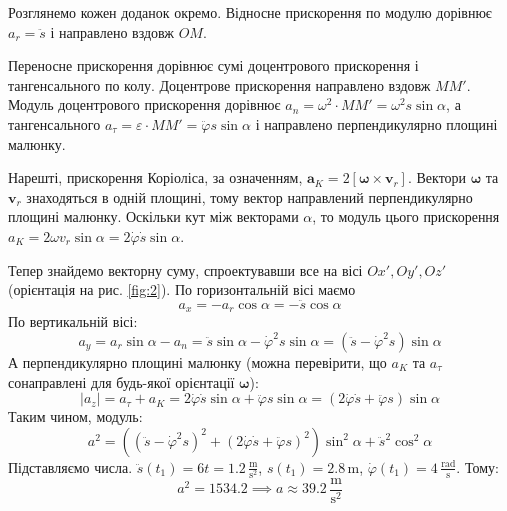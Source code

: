\documentclass[12pt]{extarticle}
\begin{document}
Розглянемо кожен доданок окремо. Відносне прискорення по модулю дорівнює $a_r=\ddot{s}$ і направлено вздовж $OM$. 

Переносне прискорення дорівнює сумі доцентрового прискорення і тангенсального по колу. Доцентрове прискорення направлено вздовж $MM'$. Модуль доцентрового прискорення дорівнює $a_n=\omega^2\cdot MM' = \omega^2s \sin\alpha$, а тангенсального $a_{\tau}=\varepsilon \cdot MM' = \ddot{\varphi}s \sin\alpha$ і направлено перпендикулярно площині малюнку. 

Нарешті, прискорення Коріоліса, за означенням, $\mathbf{a}_K = 2[\boldsymbol{\omega} \times \mathbf{v}_r]$. Вектори $\boldsymbol{\omega}$ та $\mathbf{v}_r$ знаходяться в одній площині, тому вектор направлений перпендикулярно площині малюнку. Оскільки кут між векторами $\alpha$, то модуль цього прискорення $a_K = 2\omega v_r \sin\alpha = 2\dot{\varphi}\dot{s}\sin\alpha$.

Тепер знайдемо векторну суму, спроектувавши все на вісі $Ox',Oy',Oz'$ (орієнтація на рис. \ref{fig:2}). 
По горизонтальній вісі маємо
\[
a_x = -a_r \cos\alpha = -\ddot{s}\cos\alpha
\]
По вертикальній вісі:
\[
a_y = a_r \sin\alpha - a_n = \ddot{s}\sin\alpha - \dot{\varphi}^2s \sin \alpha = (\ddot{s} - \dot{\varphi}^2 s)\sin\alpha
\]
А перпендикулярно площині малюнку (можна перевірити, що $a_K$ та $a_{\tau}$ сонаправлені для будь-якої орієнтації $\boldsymbol{\omega}$):
\[
|a_z| = a_\tau + a_K = 2\dot{\varphi}\dot{s}\sin\alpha + \ddot{\varphi} s \sin\alpha =  (2\dot{\varphi}\dot{s}+\ddot{\varphi}s)\sin\alpha
\]
Таким чином, модуль:
\[
a^2 = ((\ddot{s}-\dot{\varphi}^2s)^2 + (2\dot{\varphi}\dot{s}+\ddot{\varphi}s)^2)\sin^2\alpha + \ddot{s}^2\cos^2\alpha
\]
Підставляємо числа. $\ddot{s}(t_1)=6t=1.2 \, \frac{\text{m}}{\text{s}^2}$, $s(t_1)=2.8 \, \text{m}$, $\dot{\varphi}(t_1)=4\, \frac{\text{rad}}{\text{s}}$. Тому:
\[
a^2 = 1534.2 \implies a \approx 39.2 \, \frac{\text{m}}{\text{s}^2}
\]
\end{document}
